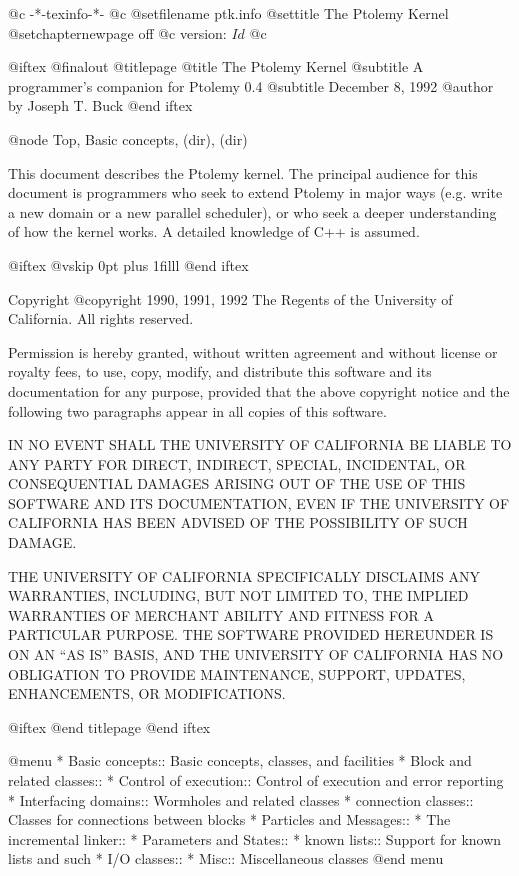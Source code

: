       @c -*-texinfo-*-
@c %
@setfilename ptk.info
@settitle The Ptolemy Kernel
@setchapternewpage off
@c version: $Id$
@c %

@iftex
@finalout
@titlepage
@title The Ptolemy Kernel
@subtitle A programmer's companion for Ptolemy 0.4
@subtitle December 8, 1992
@author by Joseph T. Buck
@end iftex

@node Top, Basic concepts, (dir), (dir)

This document describes the Ptolemy kernel.  The principal audience for
this document is programmers who seek to extend Ptolemy in major ways
(e.g. write a new domain or a new parallel scheduler), or who seek a
deeper understanding of how the kernel works.  A detailed knowledge of
C++ is assumed.

@iftex
@vskip 0pt plus 1filll
@end iftex

Copyright @copyright{} 1990, 1991, 1992 The Regents of the University of
California.  All rights reserved.

Permission is hereby granted, without written agreement and without
license or royalty fees, to use, copy, modify, and distribute this
software and its documentation for any purpose, provided that the above
copyright notice and the following two paragraphs appear in all copies of
this software.

IN NO EVENT SHALL THE UNIVERSITY OF CALIFORNIA BE LIABLE TO ANY PARTY FOR
DIRECT, INDIRECT, SPECIAL, INCIDENTAL, OR CONSEQUENTIAL DAMAGES ARISING
OUT OF THE USE OF THIS SOFTWARE AND ITS DOCUMENTATION, EVEN IF THE
UNIVERSITY OF CALIFORNIA HAS BEEN ADVISED OF THE POSSIBILITY OF SUCH
DAMAGE.

THE UNIVERSITY OF CALIFORNIA SPECIFICALLY DISCLAIMS ANY WARRANTIES,
INCLUDING, BUT NOT LIMITED TO, THE IMPLIED WARRANTIES OF MERCHANT ABILITY
AND FITNESS FOR A PARTICULAR PURPOSE. THE SOFTWARE PROVIDED HEREUNDER IS
ON AN ``AS IS'' BASIS, AND THE UNIVERSITY OF CALIFORNIA HAS NO OBLIGATION
TO PROVIDE MAINTENANCE, SUPPORT, UPDATES, ENHANCEMENTS, OR MODIFICATIONS.

@iftex
@end titlepage
@end iftex

@menu
* Basic concepts::              Basic concepts, classes, and facilities
* Block and related classes::
* Control of execution::        Control of execution and error reporting
* Interfacing domains::         Wormholes and related classes
* connection classes::          Classes for connections between blocks
* Particles and Messages::
* The incremental linker::
* Parameters and States::
* known lists::                 Support for known lists and such
* I/O classes::
* Misc::                        Miscellaneous classes
@end menu


